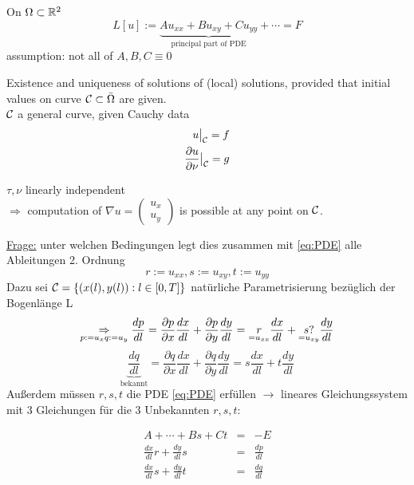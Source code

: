 \begin{bemerkung*}
On $\Omega\subset\mathbb{R}^2$
\begin{equation*}%
    L[u] := \underbrace{Au_{xx} + Bu_{xy} + Cu_{yy}}_{\text{principal part of PDE}} + \cdots = F
    \label{}
\end{equation*}
assumption: not all of $A,B,C \equiv 0$

Existence and uniqueness of solutions of (local) solutions, provided that initial values on curve $\mathcal{C}\subset\bar{\Omega}$ are given.\\
$\mathcal{C}$ a general curve, given Cauchy data 
\begin{eqnarray*}
    u\big|_{\mathcal{C}} = f \\
    \frac{\partial u}{\partial \nu} \big|_{\mathcal{C}} = g
    \label{}
\end{eqnarray*}

$\tau, \nu$ linearly independent \\
$\Rightarrow$ computation of $\nabla u = \begin{pmatrix} u_x\\ u_y\end{pmatrix}$ is possible at any point on $\mathcal{C}$.
\end{bemerkung*}

\underline{Frage:} unter welchen Bedingungen legt dies zusammen mit \eqref{eq:PDE} alle Ableitungen 2. Ordnung 
\begin{equation} %
    r:=u_{xx}, s:=u_{xy}, t:=u_{yy}
    \label{}
\end{equation}
Dazu sei $\mathcal{C} = \left\{ \left( x(l), y(l) \right): l\in [0,T] \right\}$ natürliche Parametrisierung bezüglich der Bogenlänge L
\[
    \underset{p:=u_x\\q:=u_y}{\Rightarrow} \frac{dp}{dl} = \frac{\partial p}{\partial x} \frac{dx}{dl} + \frac{\partial p}{\partial y}\frac{dy}{dl} \\
    = \underset{=u_{xx}}{r} \frac{dx}{dl} + \underset{=u_{xy}}{s?} \frac{dy}{dl}
\]
\[
    \underbrace{\frac{dq}{dl}}_{\text{bekannt}} = \frac{\partial q}{\partial x} \frac{dx}{dl} + \frac{\partial q}{\partial y} \frac{dy}{dl}
    = s \frac{dx}{dl} + t\frac{dy}{dl}
\]
Außerdem müssen $r,s,t$ die PDE \eqref{eq:PDE} erfüllen $\to$ lineares Gleichungssystem mit 3 Gleichungen für die 3 Unbekannten $r,s,t:$

\begin{eqnarray} %
    A+\cdots + Bs + Ct &=&  -E\\
    \frac{dx}{dl} r + \frac{dy}{dl} s &=& \frac{dp}{dl}\\
    \frac{dx}{dl} s + \frac{dy}{dl} t &=& \frac{dq}{dl}
    \label{eq:rst}
\end{eqnarray}

